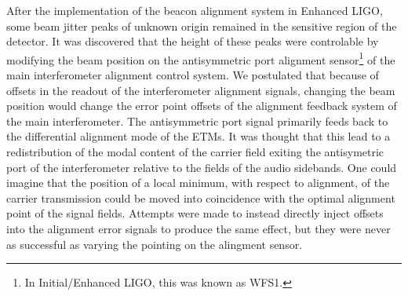 After the implementation of the beacon alignment system in Enhanced LIGO, some beam jitter peaks of unknown origin remained in the sensitive region of the detector. %
It was discovered that the height of these peaks were controlable by modifying the beam position on the antisymmetric port alignment sensor\footnote{In Initial/Enhanced LIGO, this was known as WFS1.} of the main interferometer alignment control system. %
We postulated that because of offsets in the readout of the interferometer alignment signals, changing the beam position would change the error point offsets of the alignment feedback system of the main interferometer. %
The antisymmetric port signal primarily feeds back to the differential alignment mode of the ETMs. %
It was thought that this lead to a redistribution of the modal content of the carrier field exiting the antisymetric port of the interferometer relative to the fields of the audio sidebands. %
One could imagine that the position of a local minimum, with respect to alignment, of the carrier transmission could be moved into coincidence with the optimal alignment point of the signal fields. %
Attempts were made to instead directly inject offsets into the alignment error signals to produce the same effect, but they were never as successful as varying the pointing on the alingment sensor.
